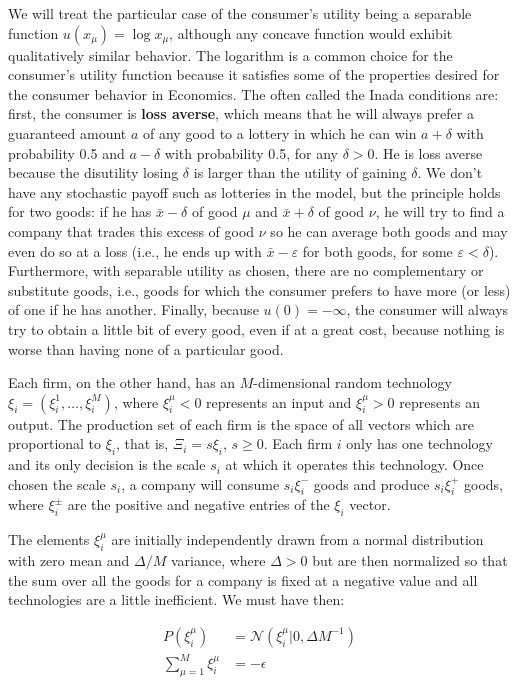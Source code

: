 We will treat the
particular case of the consumer's utility being a separable function $u(x_\mu) = \log x_\mu$, although any concave function would exhibit qualitatively similar behavior. The logarithm is a common choice for the consumer's utility function because it satisfies some of the  properties desired for the consumer behavior in Economics. The often called the Inada conditions are: first, the consumer is \textbf{loss averse}, which means that he will
always prefer a guaranteed amount $a$ of any good to a lottery in
which he can win $a + \delta$ with probability 0.5 and $a - \delta$
with probability 0.5, for any $\delta > 0$. He is loss averse because
the disutility losing $\delta$ is larger than the utility of gaining
$\delta$. We don't have any stochastic payoff such as lotteries in the model, but the principle
holds for two goods: if he has $\bar{x} - \delta$ of good $\mu$ and
$\bar{x} + \delta$ of good $\nu$, he will try to find a company that
trades this excess of good $\nu$ so he can average both goods and may even do so at a loss (i.e., he ends up with
$\bar{x} - \varepsilon$ for both goods, for some
$\varepsilon < \delta$). Furthermore, with separable utility as chosen,
there are no complementary or substitute goods, i.e., goods for which
the consumer prefers to have more (or less) of one if he has
another. Finally, because $u(0) = -\infty$, the consumer will always
try to obtain a little bit of every good, even if at a great cost,
because nothing is worse than having none of a particular good.

Each firm, on the other hand, has an $M$-dimensional random
technology $\xi_i = (\xi_i^1, \ldots, \xi_i^M)$, where $\xi_i^\mu<0$
represents an input and $\xi_i^\mu>0$ represents an output. The
production set of each firm is the space of all vectors which are
proportional to $\xi_i$, that is, $\Xi_i = s \xi_i$, $s \geq 0$. Each firm $i$ only has one technology and its only decision
is the scale $s_i$ at which it operates this technology. Once chosen
the scale $s_i$, a company will consume $s_i \xi_i^-$ goods and
produce $s_i \xi_i^+$ goods, where $\xi_i^{\pm}$ are the positive and
negative entries of the $\xi_i$ vector.

The elements $\xi_i^\mu$ are initially independently drawn from a normal
distribution with zero mean and $\Delta/M$ variance, where $\Delta >
0$ but are then normalized so that the
sum over all the goods for a company is fixed at a negative value and
all technologies are a little inefficient. We must have then:

\begin{align}
  \label{eq:rle_2}
  P(\xi_i^\mu) & = \mathcal{N}(\xi_i^\mu | 0, \Delta M^{-1}) \\ \sum_{\mu=1}^M
  \xi_i^\mu & = -\epsilon
\end{align}



